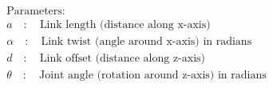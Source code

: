 \documentclass[preview]{standalone}
\begin{document}
\begin{align*}
\text{Parameters: } \\ a \quad : \quad \text{Link length (distance along x-axis)} \\ \alpha \quad : \quad \text{Link twist (angle around x-axis) in radians} \\ d \quad : \quad \text{Link offset (distance along z-axis)} \\ \theta \quad : \quad \text{Joint angle (rotation around z-axis) in radians}
\end{align*}
\end{document}
